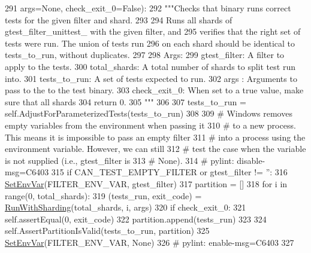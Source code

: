\begin{DoxyCode}
291                                args=\textcolor{keywordtype}{None}, check\_exit\_0=\textcolor{keyword}{False}):
292     \textcolor{stringliteral}{"""Checks that binary runs correct tests for the given filter and shard.}
293 \textcolor{stringliteral}{}
294 \textcolor{stringliteral}{    Runs all shards of gtest\_filter\_unittest\_ with the given filter, and}
295 \textcolor{stringliteral}{    verifies that the right set of tests were run. The union of tests run}
296 \textcolor{stringliteral}{    on each shard should be identical to tests\_to\_run, without duplicates.}
297 \textcolor{stringliteral}{}
298 \textcolor{stringliteral}{    Args:}
299 \textcolor{stringliteral}{      gtest\_filter: A filter to apply to the tests.}
300 \textcolor{stringliteral}{      total\_shards: A total number of shards to split test run into.}
301 \textcolor{stringliteral}{      tests\_to\_run: A set of tests expected to run.}
302 \textcolor{stringliteral}{      args   :      Arguments to pass to the to the test binary.}
303 \textcolor{stringliteral}{      check\_exit\_0: When set to a true value, make sure that all shards}
304 \textcolor{stringliteral}{                    return 0.}
305 \textcolor{stringliteral}{    """}
306 
307     tests\_to\_run = self.AdjustForParameterizedTests(tests\_to\_run)
308 
309     \textcolor{comment}{# Windows removes empty variables from the environment when passing it}
310     \textcolor{comment}{# to a new process.  This means it is impossible to pass an empty filter}
311     \textcolor{comment}{# into a process using the environment variable.  However, we can still}
312     \textcolor{comment}{# test the case when the variable is not supplied (i.e., gtest\_filter is}
313     \textcolor{comment}{# None).}
314     \textcolor{comment}{# pylint: disable-msg=C6403}
315     \textcolor{keywordflow}{if} CAN\_TEST\_EMPTY\_FILTER \textcolor{keywordflow}{or} gtest\_filter != \textcolor{stringliteral}{''}:
316       \hyperlink{namespacegtest__filter__unittest_a8ba027a73134bf97696651252457b492}{SetEnvVar}(FILTER\_ENV\_VAR, gtest\_filter)
317       partition = []
318       \textcolor{keywordflow}{for} i \textcolor{keywordflow}{in} range(0, total\_shards):
319         (tests\_run, exit\_code) = \hyperlink{namespacegtest__filter__unittest_a4d88cc7e4faf5305640a66dc487b33fb}{RunWithSharding}(total\_shards, i, args)
320         \textcolor{keywordflow}{if} check\_exit\_0:
321           self.assertEqual(0, exit\_code)
322         partition.append(tests\_run)
323 
324       self.AssertPartitionIsValid(tests\_to\_run, partition)
325       \hyperlink{namespacegtest__filter__unittest_a8ba027a73134bf97696651252457b492}{SetEnvVar}(FILTER\_ENV\_VAR, \textcolor{keywordtype}{None})
326     \textcolor{comment}{# pylint: enable-msg=C6403}
327 
\end{DoxyCode}
